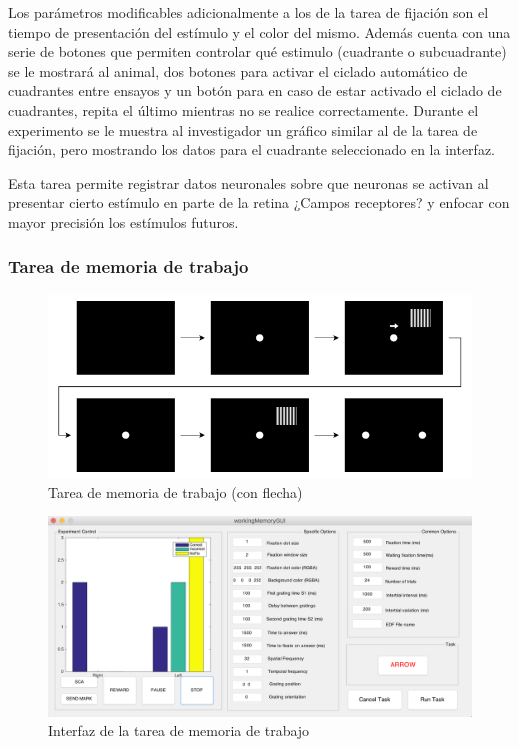\documentclass[conference]{IEEEtran}
\begin{document}
Los parámetros modificables adicionalmente a los de la tarea de fijación son el tiempo de presentación del estímulo y el color del mismo. Además cuenta con una serie de botones que permiten controlar qué estimulo (cuadrante o subcuadrante) se le mostrará al animal, dos botones para activar el ciclado automático de cuadrantes entre ensayos y un botón para en caso de estar activado el ciclado de cuadrantes, repita el último mientras no se realice correctamente.
Durante el experimento se le muestra al investigador un gráfico similar al de la tarea de fijación, pero mostrando los datos para el cuadrante seleccionado en la interfaz.


Esta tarea permite registrar datos neuronales sobre que neuronas se activan al presentar cierto estímulo en parte de la retina ¿Campos receptores? y enfocar con mayor precisión los estímulos futuros.


\subsubsection*{Tarea de memoria de trabajo}

\begin{figure}[htbp]
\centerline{\includegraphics[width=\linewidth]{figures/memory_task}}
\caption{Tarea de memoria de trabajo (con flecha)}
\label{figMemoryTask}
\end{figure}

\begin{figure}
  \includegraphics[width=\textwidth]{figures/memory_gui}
  \caption{Interfaz de la tarea de memoria de trabajo}
  \label{figMemoryGui}

\end{figure}
\end{document}

